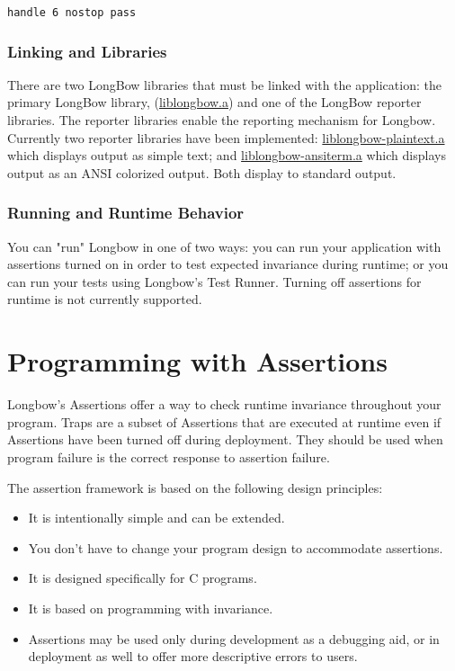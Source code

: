 \documentclass[12pt]{article} %
\begin{document}
 
\hfill \texttt{handle 6 nostop pass} \hfill \break
 
\subsubsection{Linking and Libraries}
There are two LongBow libraries that must be linked with the application: the primary LongBow library, (\url{liblongbow.a}) and one of the LongBow reporter libraries. The reporter libraries enable the reporting mechanism for Longbow.   Currently two reporter libraries have been implemented:  \url{liblongbow-plaintext.a} which displays output as simple text; and  \url{liblongbow-ansiterm.a} which displays output as an ANSI colorized output. Both display to standard output.

\subsubsection{Running and Runtime Behavior}
You can "run" Longbow in one of two ways: you can run your application with assertions turned on in order to test expected invariance during runtime; or you can run your tests using Longbow's Test Runner.  Turning off assertions for runtime is not currently supported.
 
\section{Programming with Assertions} 

 Longbow's  Assertions offer a way to check runtime invariance throughout your program.  Traps are a subset of Assertions that are executed at runtime even if Assertions have been turned off during deployment. They should be used when program failure is the correct response to assertion failure.
 
The assertion framework is based on the following design principles:
\begin{itemize}
\item  It is intentionally simple and can be extended.
\item  You don't have to change your program design to accommodate assertions.
\item  It is designed specifically for C programs.
\item  It is based on programming with invariance.
\item  Assertions may be used only during development as a debugging aid, or in deployment as well to offer more descriptive errors to users.
\end{itemize}
\end{document}
